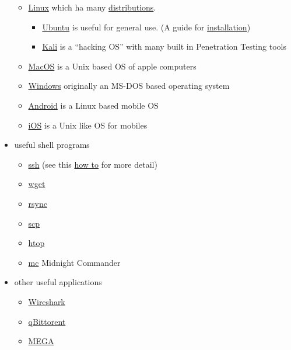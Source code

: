 \documentclass{article}
\begin{document}
\begin{itemize}
\begin{itemize}
        \item \href{https://en.wikipedia.org/wiki/Linux}{Linux} which ha many \href{https://en.wikipedia.org/wiki/Linux_distribution}{distributions}.
        \begin{itemize}
            \item \href{https://ubuntu.com/}{Ubuntu} is useful for general use. (A guide for \href{https://itsfoss.com/install-ubuntu/}{installation})
            \item \href{https://www.kali.org/}{Kali} is a ``hacking OS'' with many built in Penetration Testing tools
        \end{itemize}
        \item \href{https://www.apple.com/macos/}{MacOS} is a Unix based OS of apple computers
        \item \href{https://www.microsoft.com/en-us/windows/}{Windows} originally an MS-DOS based operating system
        \item \href{https://www.android.com/}{Android} is a Linux based mobile OS
        \item \href{https://www.apple.com/ios/}{iOS} is a Unix like OS for mobiles
    \end{itemize}
    
    \item useful shell programs
    \begin{itemize}
        \item \href{https://linux.die.net/man/1/ssh}{ssh} (see this  \href{https://www.howtogeek.com/311287/how-to-connect-to-an-ssh-server-from-windows-macos-or-linux/}{how to} for more detail)
        \item \href{https://www.gnu.org/software/wget/manual/wget.html}{wget}
        \item \href{https://linux.die.net/man/1/rsync}{rsync}
        \item \href{https://linux.die.net/man/1/scp}{scp}
        \item \href{https://linux.die.net/man/1/htop}{htop}
        \item \href{https://linux.die.net/man/1/mc}{mc} Midnight Commander
    \end{itemize}
    
    \item other useful applications
    \begin{itemize}
        \item \href{https://www.wireshark.org/}{Wireshark}
        \item \href{https://www.qbittorrent.org/}{qBittorent}
        \item \href{https://mega.nz/}{MEGA}
    \end{itemize}
    

\end{itemize}
\end{document}
